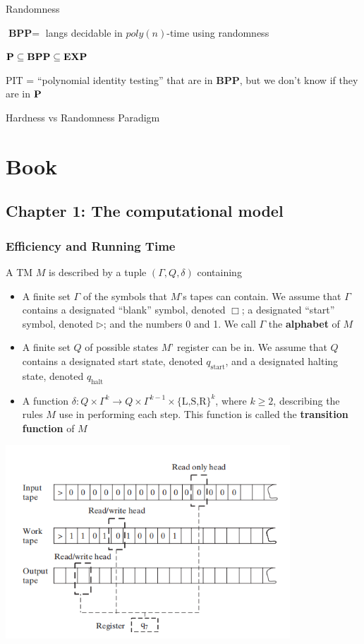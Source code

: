 \documentclass[11pt]{article}
\def \EXP {\textbf{EXP}}
\def \BPP {\textbf{BPP}}
\def \start {\text{start}}
\def \halt {\text{halt}}
\begin{document}
Randomness

\(\BPP=\) langs decidable in \(poly(n)\)-time using randomness

\(\bP\subseteq\BPP\subseteq\EXP\)

PIT = ``polynomial identity testing'' that are in \(\BPP\), but we don't know if they are in \(\operatorname{\textbf{P}}\)

Hardness vs Randomness Paradigm


\section{Book}
\label{sec:org1f46f93}
\subsection{Chapter 1: The computational model}
\label{sec:orga580d59}

\subsubsection{Efficiency and Running Time}
\label{sec:org5ac82f1}
\begin{definition}[]
A TM \(M\) is described by a tuple \((\Gamma,Q,\delta)\) containing
\begin{itemize}
\item A finite set \(\Gamma\) of the symbols that \(M\)'s tapes can contain. We assume that \(\Gamma\) contains a
designated ``blank'' symbol, denoted \(\Box\); a designated ``start'' symbol, denoted \(\rhd\);
and the numbers 0 and 1. We call \(\Gamma\) the \textbf{alphabet} of \(M\)
\item A finite set \(Q\) of possible states \(M\)' register can be in. We assume that \(Q\) contains
a designated start state, denoted \(q_{\start}\), and a designated halting state, denoted \(q_{\halt}\)
\item A function \(\delta:Q\times\Gamma^k\to Q\times\Gamma^{k-1}\times\{\text{L,S,R}\}^k\),
where \(k\ge2\), describing the rules \(M\) use in performing each step. This function is
called the \textbf{transition function} of \(M\)
\end{itemize}
\end{definition}

\begin{center}
\includegraphics[width=0.8\textwidth]{../images/ComputationalComplexity/1.png}
\end{center}
\end{document}
